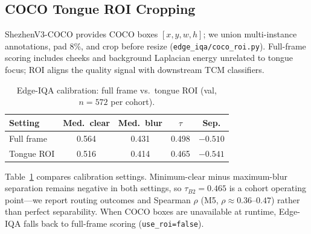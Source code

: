 \subsection{COCO Tongue ROI Cropping}
\label{sec:roi}

ShezhenV3-COCO provides COCO boxes $[x,y,w,h]$; we union multi-instance annotations, pad 8\%, and crop before resize (\texttt{edge\_iqa/coco\_roi.py}).
Full-frame scoring includes cheeks and background Laplacian energy unrelated to tongue focus; ROI aligns the quality signal with downstream TCM classifiers.

\begin{table}[!t]
\centering
\caption{Edge-IQA calibration: full frame vs.\ tongue ROI (val, $n{=}572$ per cohort).}
\label{tab:roi-ablation}
\small
\setlength{\tabcolsep}{4pt}
\begin{tabular}{lcccc}
\hline
Setting & Med.\ clear & Med.\ blur & $\tau$ & Sep. \\
\hline
Full frame & 0.564 & 0.431 & 0.498 & $-0.510$ \\
Tongue ROI & 0.516 & 0.414 & 0.465 & $-0.541$ \\
\hline
\end{tabular}
\end{table}

Table~\ref{tab:roi-ablation} compares calibration settings.
Minimum-clear minus maximum-blur separation remains negative in both settings, so $\tau_{B2}{=}0.465$ is a cohort operating point---we report routing outcomes and Spearman $\rho$ (M5, $\rho{\approx}0.36$--$0.47$) rather than perfect separability.
When COCO boxes are unavailable at runtime, Edge-IQA falls back to full-frame scoring (\texttt{use\_roi=false}).
